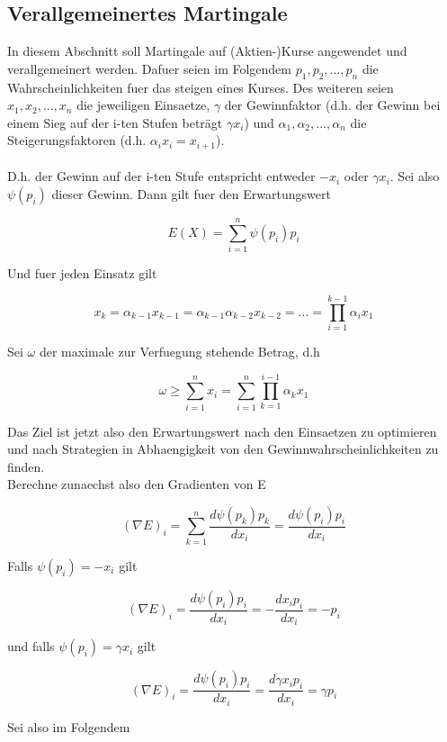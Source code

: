 \documentclass[11pt]{scrartcl}
\begin{document}
		\subsection{Verallgemeinertes Martingale}
			In diesem Abschnitt soll Martingale auf (Aktien-)Kurse angewendet und verallgemeinert werden. Dafuer seien im Folgendem \(p_{1}, p_{2}, ...,p_{n}\) die Wahrscheinlichkeiten fuer das steigen eines Kurses. Des weiteren seien \(x_{1}, x_{2}, ...,x_{n}\) die jeweiligen Einsaetze, \(\gamma\) der Gewinnfaktor (d.h. der Gewinn bei einem Sieg auf der i-ten Stufen beträgt \(\gamma x_{i}\)) und \(\alpha_{1}, \alpha_{2}, ...,\alpha_{n}\) die Steigerungsfaktoren (d.h. \(\alpha_{i}x_{i}=x_{i+1}\)).\\\\
			D.h. der Gewinn auf der i-ten Stufe entspricht entweder \(-x_{i}\) oder \(\gamma x_{i}\). Sei also \(\psi(p_{i})\) dieser Gewinn. Dann gilt fuer den Erwartungswert
			\begin{center}
				\[E(X)=\sum_{i=1}^n \psi(p_{i})p_{i}\]
			\end{center}
			Und fuer jeden Einsatz gilt
			\begin{center}
				\[x_{k}=\alpha_{k-1}x_{k-1}=\alpha_{k-1}\alpha_{k-2}x_{k-2}=...=\prod_{i=1}^{k-1}\alpha_{i}x_{1}\]
			\end{center}
			Sei \(\omega\) der maximale zur Verfuegung stehende Betrag, d.h
			\begin{center}
				\[\omega \geq \sum_{i=1}^{n}x_{i}=\sum_{i=1}^{n}\prod_{k=1}^{i-1}\alpha_{k}x_{1}\]
			\end{center}
			Das Ziel ist jetzt also den Erwartungswert nach den Einsaetzen zu optimieren und nach Strategien in Abhaengigkeit von den Gewinnwahrscheinlichkeiten zu finden.\\
			Berechne zunaechst also den Gradienten von E
			\begin{center}
				\[(\nabla E)_{i}=\sum_{k=1}^{n}\frac{d\psi(p_{k})p_{k}}{dx_{i}}=\frac{d\psi(p_{i})p_{i}}{dx_{i}}\]
			\end{center}
			Falls \(\psi(p_{i})=-x_{i}\) gilt
			\begin{center}
				\[(\nabla E)_{i}=\frac{d\psi(p_{i})p_{i}}{dx_{i}}=-\frac{dx_{i}p_{i}}{dx_{i}}=-p_{i}\]
			\end{center}
			und falls \(\psi(p_{i})=\gamma x_{i}\) gilt
			\begin{center}
				\[(\nabla E)_{i}=\frac{d\psi(p_{i})p_{i}}{dx_{i}}=\frac{d\gamma x_{i}p_{i}}{dx_{i}}=\gamma p_{i}\]
			\end{center}
			Sei also im Folgendem
\end{document}
